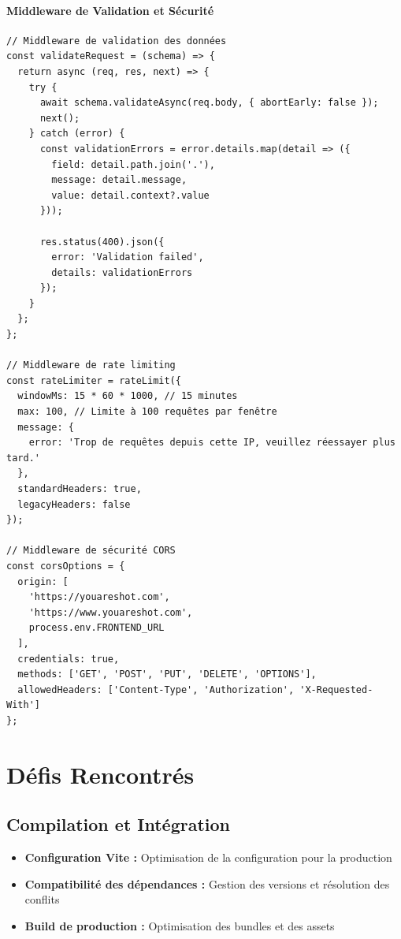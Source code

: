 \documentclass[12pt,a4paper]{article}
\begin{document}
\paragraph{Middleware de Validation et Sécurité}
\begin{lstlisting}[caption=Middleware de validation avancée]
// Middleware de validation des données
const validateRequest = (schema) => {
  return async (req, res, next) => {
    try {
      await schema.validateAsync(req.body, { abortEarly: false });
      next();
    } catch (error) {
      const validationErrors = error.details.map(detail => ({
        field: detail.path.join('.'),
        message: detail.message,
        value: detail.context?.value
      }));
      
      res.status(400).json({
        error: 'Validation failed',
        details: validationErrors
      });
    }
  };
};

// Middleware de rate limiting
const rateLimiter = rateLimit({
  windowMs: 15 * 60 * 1000, // 15 minutes
  max: 100, // Limite à 100 requêtes par fenêtre
  message: {
    error: 'Trop de requêtes depuis cette IP, veuillez réessayer plus tard.'
  },
  standardHeaders: true,
  legacyHeaders: false
});

// Middleware de sécurité CORS
const corsOptions = {
  origin: [
    'https://youareshot.com',
    'https://www.youareshot.com',
    process.env.FRONTEND_URL
  ],
  credentials: true,
  methods: ['GET', 'POST', 'PUT', 'DELETE', 'OPTIONS'],
  allowedHeaders: ['Content-Type', 'Authorization', 'X-Requested-With']
};
\end{lstlisting}

\section{Défis Rencontrés}

\subsection{Compilation et Intégration}
\begin{itemize}
    \item \textbf{Configuration Vite :} Optimisation de la configuration pour la production
    \item \textbf{Compatibilité des dépendances :} Gestion des versions et résolution des conflits
    \item \textbf{Build de production :} Optimisation des bundles et des assets
\end{itemize}
\end{document}
